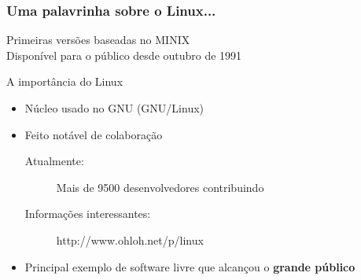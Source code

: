 \documentclass[xcolor=dvipsnames]{beamer}
\begin{document}
\begin{frame}
\frametitle{Uma palavrinha sobre o Linux...}
Primeiras versões baseadas no MINIX
\\[0.2cm]
Disponível para o público desde outubro de 1991\\[0.2cm]
  \begin{block}{A importância do Linux} 
  \begin{itemize}
  \item Núcleo usado no GNU (GNU/Linux) \vspace{0.1cm}
  \item Feito notável de colaboração 
  \begin{description}
  \item [Atualmente:] Mais de 9500 desenvolvedores contribuindo
  \item [Informações interessantes:] http://www.ohloh.net/p/linux
  \end{description}
\vspace{0.1cm}  \item Principal exemplo de software livre que alcançou o {\bf grande público}
 
  \end{itemize}
  \end{block}
\end{frame}
\end{document}
